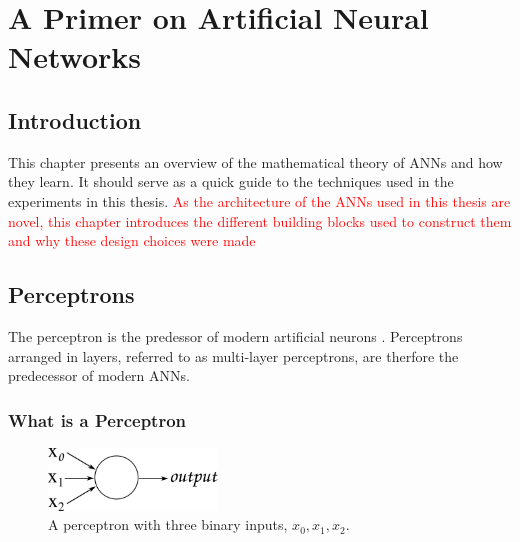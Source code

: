 \chapter{A Primer on Artificial Neural Networks} %

\label{Chapter2} %


\section{Introduction}
This chapter presents an overview of the mathematical theory of \acp{ANN} and how they learn. It should serve as a quick guide to the techniques used in the experiments in this thesis. \textcolor{red}{As the architecture of the \acp{ANN} used in this thesis are novel, this chapter introduces the different building blocks used to construct them and why these design choices were made}

\section{Perceptrons}
\label{sec:percep}
The perceptron is the predessor of modern artificial neurons \cite{rosenblatt1958perceptron}.
Perceptrons arranged in layers, referred to as multi-layer perceptrons, are therfore the predecessor of modern \acp{ANN}.

\subsection{What is a Perceptron}



\begin{figure}
	\centering
	\includegraphics[width=0.4\textwidth]{Figs/intro2dl/perceptron.png}
	
	\caption{A perceptron with three binary inputs, $x_0, x_1, x_2$.}
	\label{fig:perceptron}
\end{figure}

